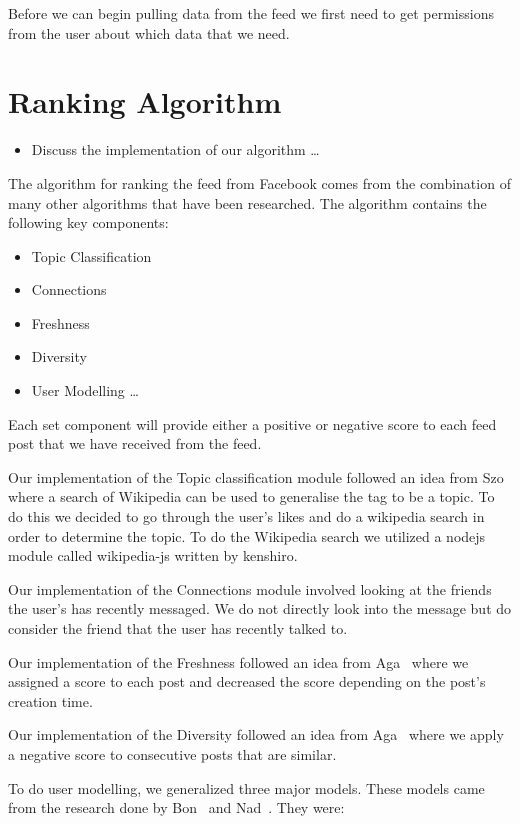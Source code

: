 Before we can begin pulling data from the feed we first need to get permissions from the user about which data that we need. 

\section{Ranking Algorithm}

\begin{itemize}
  \item Discuss the implementation of our algorithm
\ldots
\end{itemize}

The algorithm for ranking the feed from Facebook comes from the combination of many other algorithms that have been researched. The algorithm contains the following key components:

\begin{itemize}
	\item Topic Classification
 	\item Connections
  	\item Freshness
	\item Diversity
	\item User Modelling
\ldots
\end{itemize}

Each set component will provide either a positive or negative score to each feed post that we have received from the feed.

Our implementation of the Topic classification module followed an idea from Szo~\cite{szomszor2008semantic} where a search of Wikipedia can be used to generalise the tag to be a topic. To do this we decided to go through the user's likes and do a wikipedia search in order to determine the topic. To do the Wikipedia search we utilized a nodejs module called wikipedia-js written by kenshiro.

Our implementation of the Connections module involved looking at the friends the user's has recently messaged. We do not directly look into the message but do consider the friend that the user has recently talked to. 

Our implementation of the Freshness followed an idea from Aga~\cite{Aga2014} where we assigned a score to each post and decreased the score depending on the post's creation time. 

Our implementation of the Diversity followed an idea from Aga~\cite{Aga2014} where we apply a negative score to consecutive posts that are similar.

To do user modelling, we generalized three major models. These models came from the research done by Bon~\cite{bonds2010myspace} and Nad~\cite{nadkarni2012people}. They were:

